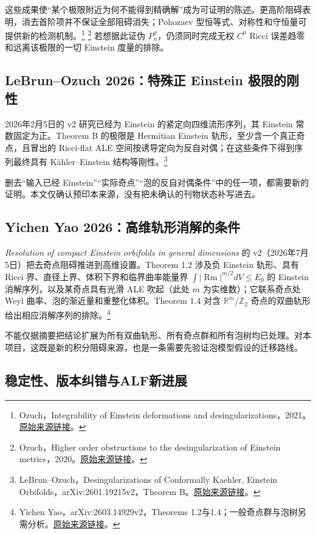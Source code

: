 \documentclass[11pt,a4paper]{article}
\theoremstyle{definition}
\newcommand{\Rm}{\operatorname{Rm}}
\newcommand{\src}[3]{\footnote{\raggedright #1，#2。\href{#3}{原始来源链接}。}}
\begin{document}
这些成果使“某个极限附近为何不能得到精确解”成为可证明的陈述。更高阶阻碍表明，消去首阶项并不保证全部阻碍消失；Pohozaev 型恒等式、对称性和守恒量可提供新的检测机制。\src{Ozuch}{Integrability of Einstein deformations and desingularizations，2021}{https://arxiv.org/abs/2105.13193}
\src{Ozuch}{Higher order obstructions to the desingularization of Einstein metrics，2020}{https://arxiv.org/abs/2012.13316}
若想据此证伪 $P_n^\sigma$，仍须同时完成无权 $C^0$ Ricci 误差趋零和远离该极限的一切 Einstein 度量的排除。

\subsection{LeBrun--Ozuch 2026：特殊正 Einstein 极限的刚性}

2026年2月5日的 v2 研究已经为 Einstein 的紧定向四维流形序列，其 Einstein 常数固定为正。Theorem B 的极限是 Hermitian Einstein 轨形，至少含一个真正奇点，且冒出的 Ricci-flat ALE 空间按诱导定向为反自对偶；在这些条件下得到序列最终具有 Kähler--Einstein 结构等刚性。\src{LeBrun--Ozuch}{Desingularizations of Conformally Kaehler, Einstein Orbifolds，arXiv:2601.19215v2，Theorem B}{https://arxiv.org/html/2601.19215v2}

删去“输入已经 Einstein”“实际奇点”“泡的反自对偶条件”中的任一项，都需要新的证明。本文仅确认预印本来源，没有把未确认的刊物状态补写进去。

\subsection{Yichen Yao 2026：高维轨形消解的条件}

\emph{Resolution of compact Einstein orbifolds in general dimensions} 的 v2（2026年7月5日）把去奇点阻碍推进到高维设置。Theorem 1.2 涉及负 Einstein 轨形、具有 Ricci 界、直径上界、体积下界和临界曲率能量界 $\int|\Rm|^{m/2}dV\le E_0$ 的 Einstein 消解序列，以及某奇点具有光滑 ALE 吹起（此处 $m$ 为实维数）；它联系奇点处 Weyl 曲率、泡的渐近量和重整化体积。Theorem 1.4 对含 $\mathbb R^m/\mathbb Z_2$ 奇点的双曲轨形给出相应消解序列的排除。\src{Yichen Yao}{arXiv:2603.14929v2，Theorems 1.2与1.4；一般奇点群与泡树另需分析}{https://arxiv.org/html/2603.14929v2}

不能仅据摘要把结论扩展为所有双曲轨形、所有奇点群和所有泡树均已处理。对本项目，这既是新的积分阻碍来源，也是一条需要先验证泡模型假设的迁移路线。

\subsection{稳定性、版本纠错与ALF新进展}
\end{document}
